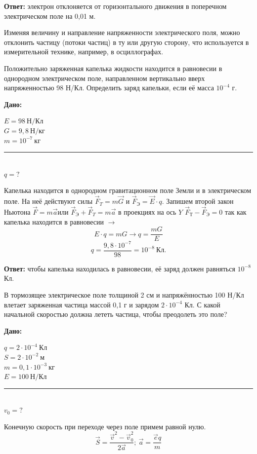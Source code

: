 \documentclass[a5paper, 10pt]{diss_4}
\newcommand{\TNF}{$\vec{F}=m\vec{a}$}
\renewcommand{\'}{\,'}
\begin{document}
\textbf{Ответ:}  электрон отклоняется от горизонтального движения в поперечном электрическом поле на 0,01 м.

Изменяя величину и направление напряженности электрического поля, можно отклонить частицу (потоки частиц) в
ту или другую сторону, что используется в измерительной технике, например, в осциллографах.

Положительно заряженная капелька жидкости находится в равновесии в однородном электрическом поле, направленном  вертикально вверх напряженностью  98 Н/Кл. Определить заряд капельки, если её масса  $10^{-4}$ г.

\hspace{1cm}\textbf{Дано:}\hspace{.3cm}
\parbox[t]{4cm}{
$E = 98\ Н/Кл$\\
$G = 9,8\ Н/кг$\\
$m = 10^{-7}\ кг$\\
\rule{4cm}{.4pt}\\
$q = ?$\\
}

Капелька находится в однородном гравитационном поле Земли и в электрическом поле. На неё действуют
силы $\vec{F}_T=m\vec{G}$ и $\vec{F}_Э=\vec{E}\cdot q$.
Запишем второй закон Ньютона \TNF или $\vec{F}_Э+\vec{F}_T=m\vec{a}$ в проекциях на ось $Y$
$\vec{F}_Т-\vec{F}_Э=0$ так как капелька находится в равновесии $\to$
\[
E\cdot q=mG\to q=\frac{mG}{E}
\]
\[
q=\frac{9,8\cdot10^{-7}}{98}=10^{-8}\ Кл.
\]

\textbf{Ответ:}  чтобы капелька находилась в равновесии, её заряд должен равняться $10^{-8}$ Кл.


В тормозящее электрическое поле толщиной 2 см и напряжённостью 100 Н/Кл влетает заряженная частица массой 0,1 г
и зарядом $2\cdot10^{-4}$ Кл. С какой начальной скоростью должна лететь частица, чтобы преодолеть это поле?

\hspace{1cm}\textbf{Дано:}\hspace{.3cm}
\parbox[t]{4cm}{
$q = 2\cdot10^{-4}\ Кл$\\
$S = 2\cdot10^{-2}\ м$\\
$m = 0,1\cdot10^{-3}\ кг$\\
$E = 100\ Н/Кл$\
\rule{4cm}{.4pt}\\
$v_0 = ?$\\
}


Конечную скорость при переходе через поле примем равной нулю.
\[
\vec{S}=\frac{\vec{v}^2-\vec{v}^2_0}{2\vec{a}};\
\vec{a}=\frac{\vec{e}q}{m}
\]
\end{document}
